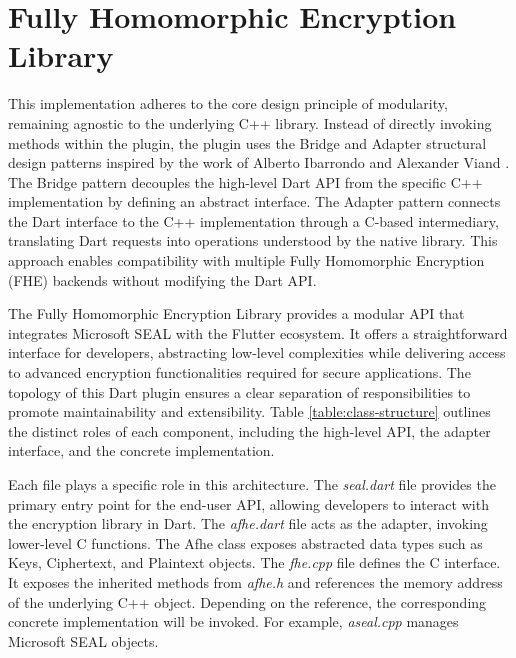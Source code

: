 \section{Fully Homomorphic Encryption Library}
\label{sec:Fully Homomorphic Encryption Library}
This implementation adheres to the core design principle of modularity, remaining agnostic to the underlying C++ library. Instead of directly invoking methods within the plugin, the plugin uses the Bridge and Adapter structural design patterns inspired by the work of Alberto Ibarrondo and Alexander Viand \cite{Ibarrondo2021-Pyfhel}. The Bridge pattern decouples the high-level Dart API from the specific C++ implementation by defining an abstract interface. The Adapter pattern connects the Dart interface to the C++ implementation through a C-based intermediary, translating Dart requests into operations understood by the native library. This approach enables compatibility with multiple Fully Homomorphic Encryption (FHE) backends without modifying the Dart API.

The Fully Homomorphic Encryption Library provides a modular API that integrates Microsoft SEAL with the Flutter ecosystem. It offers a straightforward interface for developers, abstracting low-level complexities while delivering access to advanced encryption functionalities required for secure applications. The topology of this Dart plugin ensures a clear separation of responsibilities to promote maintainability and extensibility. Table \ref{table:class-structure} outlines the distinct roles of each component, including the high-level API, the adapter interface, and the concrete implementation.



Each file plays a specific role in this architecture. The \textit{seal.dart} file provides the primary entry point for the end-user API, allowing developers to interact with the encryption library in Dart. The \textit{afhe.dart} file acts as the adapter, invoking lower-level C functions. The Afhe class exposes abstracted data types such as Keys, Ciphertext, and Plaintext objects. The \textit{fhe.cpp} file defines the C interface. It exposes the inherited methods from \textit{afhe.h} and references the memory address of the underlying C++ object. Depending on the reference, the corresponding concrete implementation will be invoked. For example, \textit{aseal.cpp} manages Microsoft SEAL objects.

